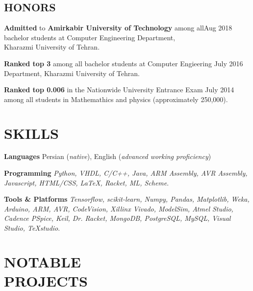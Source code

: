 \documentclass[margin, 10pt]{res} %
\begin{document}
\begin{resume}
	\section{HONORS}
	\textbf{Admitted} to 
	\textbf{Amirkabir University of Technology}
	among all\hfill {Aug 2018}\\ bachelor students at Computer Engineering 
	Department,\\ Kharazmi University of Tehran.
	
	\textbf{Ranked top 3}
	among all bachelor students at Computer Engieering \hfill {July 2016}\\ Department, Kharazmi University of Tehran.
	
	\textbf{Ranked top 0.006}
	in the Nationwide University Entrance Exam \hfill {July 2014}\\ among all students in 
	Mathemathics and physics (approximately 250,000).
    \end{resume}


	\section{SKILLS}
	
	\textbf{Languages }
	Persian (\emph{native}), English (\emph{advanced working proficiency})
	
	\textbf{Programming}
	\textit{Python, VHDL, C/C++, Java, ARM Assembly, AVR Assembly, Javascript, HTML/CSS, \LaTeX, Racket, ML, Scheme}.
	
	\textbf{Tools \& Platforms}
	\textit{Tensorflow, scikit-learn, Numpy, Pandas, Matplotlib, Weka, Arduino, ARM, AVR, CodeVision, Xillinx Vivado, ModelSim, Atmel Studio, Cadence PSpice, Keil, Dr. Racket, MongoDB, PostgreSQL, MySQL, Visual Studio, TeXstudio}.


\section{NOTABLE \\ PROJECTS}
\end{document}
